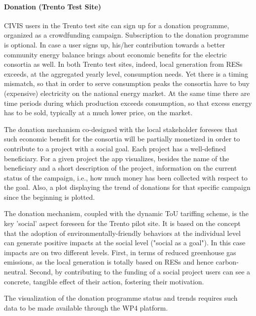 \paragraph{Donation (Trento Test Site)}
CIVIS users in the Trento test site can sign up for a donation programme, organized as a crowdfunding campaign. Subscription to the donation programme is optional. In case a user signs up, his/her contribution towards a better community energy balance brings about economic benefits for the electric consortia as well. In both Trento test sites, indeed, local generation from RESs exceeds, at the aggregated yearly level, consumption needs. Yet there is a timing mismatch, so that in order to serve consumption peaks the consortia have to buy (expensive) electricity on the national energy market. At the same time there are time periods during which production exceeds consumption, so that excess energy has to be sold, typically at a much lower price, on the market.

The donation mechanism co-designed with the local stakeholder foresees that such economic benefit for the consortia will be partially monetized in order to contribute to a project with a social goal. Each project has a well-defined beneficiary. For a given project the app visualizes, besides the name of the beneficiary and a short description of the project, information on the current status of the campaign, i.e., how much money has been collected with respect to the goal. Also, a plot displaying the trend of donations for that specific campaign since the beginning is plotted.

The donation mechanism, coupled with the dynamic ToU tariffing scheme, is the key 'social' aspect foreseen for the Trento pilot site. It is based on the concept that the adoption of environmentally-friendly behaviors at the individual level can generate positive impacts at the social level ("social as a goal"). In this case impacts are on two different levels. First, in terms of reduced greenhouse gas emissions, as the local generation is totally based on RESs and hence carbon-neutral. Second, by contributing to the funding of a social project users can see a concrete, tangible effect of their action, fostering their motivation. 

The visualization of the donation programme status and trends requires such data to be made available through the WP4 platform.

